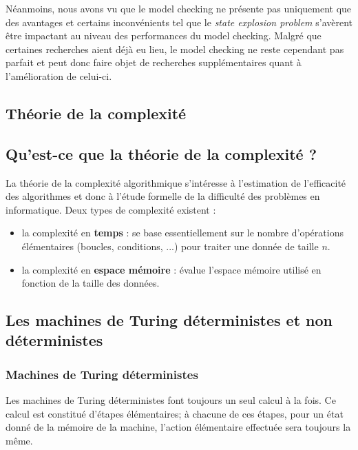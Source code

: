 \documentclass[runningheads,a4paper,10pt]{llncs}
\begin{document}
Néanmoins, nous avons vu que le model checking ne présente pas uniquement que des avantages et certains inconvénients tel que le \textit{state explosion problem} s'avèrent être impactant au niveau des performances du model checking. Malgré que certaines recherches aient déjà eu lieu, le model checking ne reste cependant pas parfait et peut donc faire objet de recherches supplémentaires quant à l'amélioration de celui-ci. 



\newpage
\begin{subappendices}
\renewcommand{\thesection}{\Alph{section}}%

\section{Théorie de la complexité} \label{sec:complexity}

\subsection{Qu'est-ce que la théorie de la complexité ?}
La théorie de la complexité algorithmique s'intéresse à l'estimation de l'efficacité des
algorithmes et donc à l'étude formelle de la difficulté des problèmes en informatique. Deux types de complexité existent : 
\begin{itemize}
\item la complexité en \textbf{temps} : se base essentiellement sur le nombre d'opérations élémentaires (boucles, conditions, ...) pour traiter une donnée de taille $n$. 

\item la complexité en \textbf{espace mémoire} :  évalue l'espace mémoire utilisé en fonction de la taille des données.  
\end{itemize}

\subsection{Les machines de Turing déterministes et non déterministes}

\subsubsection{Machines de Turing déterministes} 
Les machines de Turing déterministes font toujours un seul calcul à la fois. Ce calcul est
constitué d'étapes élémentaires; à chacune de ces étapes, pour un état donné de la mémoire de la
machine, l'action élémentaire effectuée sera toujours la même.


\end{subappendices}
\end{document}
